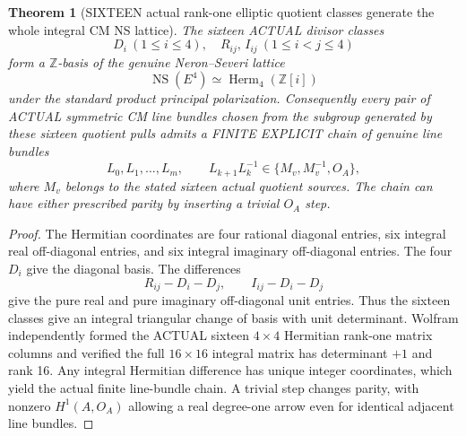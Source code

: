 \documentclass[11pt,a4paper]{article}
\newtheorem{theorem}{Theorem}[section]
\begin{document}
\begin{theorem}[SIXTEEN actual rank-one elliptic quotient classes generate the whole integral CM NS lattice]
The sixteen
ACTUAL divisor
classes
\[
 \boxed{
    D_i\ (1\le i\le4),
 \quad R_{ij},\,I_{ij}
       \ (1\le i<j\le4)
 }                                                       \tag{17.2}
\]
form a
\(\mathbb Z\)-basis
of the genuine
Neron--Severi
lattice
\[
 \operatorname{NS}(E^4)
   \simeq\operatorname{Herm}_4(\mathbb Z[i])
\]
under the
standard product
principal
polarization.
Consequently
every pair of
ACTUAL symmetric
CM line bundles
chosen from the
subgroup generated
by these sixteen
quotient pulls
admits a FINITE
EXPLICIT chain
of genuine line
bundles
\[
  L_0,L_1,\ldots,L_m,
 \qquad
 L_{k+1}L_k^{-1}
       \in\{M_v,M_v^{-1},O_A\},
                                                               \tag{17.3}
\]
where \(M_v\)
belongs to
the stated
sixteen
actual
quotient
sources.
The chain
can have
either
prescribed
parity by
inserting
a trivial
\(O_A\)
step.
\end{theorem}
\begin{proof}
The Hermitian
coordinates
are four
rational
diagonal
entries,
six integral
real
off-diagonal
entries,
and six
integral
imaginary
off-diagonal
entries.
The four
\(D_i\)
give the
diagonal
basis.
The differences
\[
 R_{ij}-D_i-D_j,
 \qquad
 I_{ij}-D_i-D_j
\]
give the
pure real
and pure
imaginary
off-diagonal
unit
entries.
Thus the
sixteen classes
give an
integral
triangular
change of
basis with
unit
determinant.
Wolfram
independently
formed the
ACTUAL sixteen
\(4\times4\)
Hermitian
rank-one
matrix
columns and
verified the
full
\(16\times16\)
integral
matrix has
determinant
\(+1\)
and rank
16.
Any
integral
Hermitian
difference
has unique
integer
coordinates,
which yield
the actual
finite
line-bundle
chain.
A trivial
step changes
parity,
with nonzero
\(H^1(A,O_A)\)
allowing a
real
degree-one
arrow even
for identical
adjacent
line bundles.
\end{proof}
\end{document}
